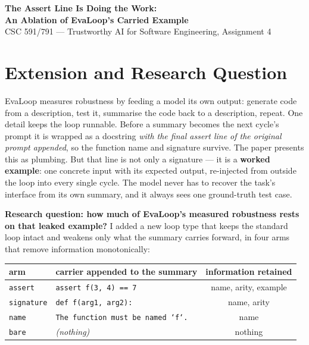 \documentclass[10pt]{article}
\newcommand{\code}[1]{\texttt{\small #1}}
\begin{document}
\begin{center}
{\Large\bfseries The Assert Line Is Doing the Work:\\[1pt]
An Ablation of EvaLoop's Carried Example}\\[3pt]
{\small CSC 591/791 --- Trustworthy AI for Software Engineering, Assignment 4}
\end{center}

\vspace{-3pt}

\section{Extension and Research Question}

EvaLoop measures robustness by feeding a model its own output: generate code
from a description, test it, summarise the code back to a description, repeat.
One detail keeps the loop runnable. Before a summary becomes the next cycle's
prompt it is wrapped as a docstring \emph{with the final assert line of the
original prompt appended}, so the function name and signature survive. The
paper presents this as plumbing. But that line is not only a signature --- it is
a \textbf{worked example}: one concrete input with its expected output,
re-injected from outside the loop into every single cycle. The model never has
to recover the task's interface from its own summary, and it always sees one
ground-truth test case.

\textbf{Research question: how much of EvaLoop's measured robustness rests on
that leaked example?} I added a new loop type that keeps the standard loop
intact and weakens only what the summary carries forward, in four arms that
remove information monotonically:

\begin{center}\small
\begin{tabular}{llc}
\toprule
arm & carrier appended to the summary & information retained \\
\midrule
\code{assert} & \code{assert f(3, 4) == 7} & name, arity, example \\
\code{signature} & \code{def f(arg1, arg2):} & name, arity \\
\code{name} & \code{The function must be named `f`.} & name \\
\code{bare} & \emph{(nothing)} & nothing \\
\bottomrule
\end{tabular}
\end{center}
\end{document}
